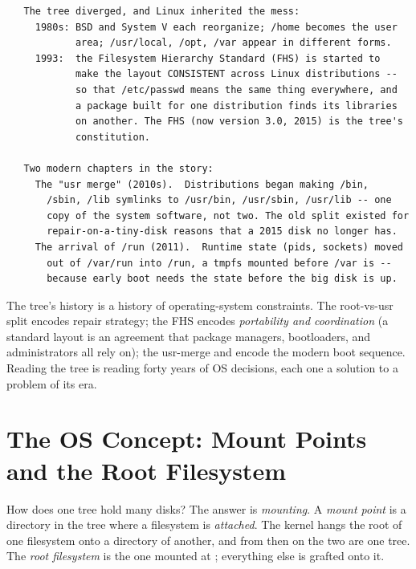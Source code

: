 \begin{verbatim}
   The tree diverged, and Linux inherited the mess:
     1980s: BSD and System V each reorganize; /home becomes the user
            area; /usr/local, /opt, /var appear in different forms.
     1993:  the Filesystem Hierarchy Standard (FHS) is started to
            make the layout CONSISTENT across Linux distributions --
            so that /etc/passwd means the same thing everywhere, and
            a package built for one distribution finds its libraries
            on another. The FHS (now version 3.0, 2015) is the tree's
            constitution.

   Two modern chapters in the story:
     The "usr merge" (2010s).  Distributions began making /bin,
       /sbin, /lib symlinks to /usr/bin, /usr/sbin, /usr/lib -- one
       copy of the system software, not two. The old split existed for
       repair-on-a-tiny-disk reasons that a 2015 disk no longer has.
     The arrival of /run (2011).  Runtime state (pids, sockets) moved
       out of /var/run into /run, a tmpfs mounted before /var is --
       because early boot needs the state before the big disk is up.
\end{verbatim}

\begin{osconcept}
The tree's history is a history of operating-system constraints. The
root-vs-usr split encodes repair strategy; the FHS encodes
\emph{portability and coordination} (a standard layout is an agreement
that package managers, bootloaders, and administrators all rely on);
the usr-merge and  encode the modern boot sequence. Reading
the tree is reading forty years of OS decisions, each one a solution
to a problem of its era.
\end{osconcept}

\section{The OS Concept: Mount Points and the Root Filesystem}

How does one tree hold many disks? The answer is \emph{mounting}. A
\emph{mount point} is a directory in the tree where a filesystem is
\emph{attached}. The kernel hangs the root of one filesystem onto a
directory of another, and from then on the two are one tree. The
\emph{root filesystem} is the one mounted at \code{/}; everything else
is grafted onto it.


